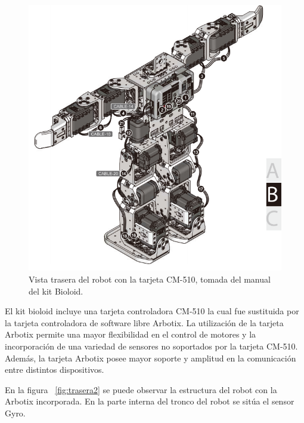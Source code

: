 \begin{figure}[hbtp]
\centering
\includegraphics[scale=0.3]{imagenes/RobotTrasero.png}
\caption{Vista trasera del robot con la tarjeta CM-510, tomada del manual del kit Bioloid.}
\label{fig:trasera1}
\end{figure}


El kit bioloid incluye una tarjeta controladora CM-510 la cual fue sustituida por la tarjeta controladora de software libre Arbotix. La utilización de la tarjeta Arbotix permite una mayor flexibilidad en el control de motores y la incorporación de una variedad de sensores no soportados por la tarjeta CM-510.
Además, la tarjeta Arbotix posee mayor soporte y amplitud en la comunicación entre distintos dispositivos. 

En la figura ~\ref{fig:trasera2} se puede observar la estructura del robot con la Arbotix incorporada. En la parte interna del tronco del robot se sitúa el sensor Gyro.

